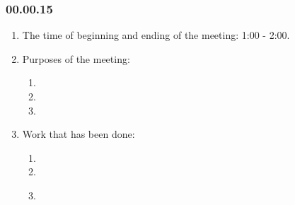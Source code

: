 \subsubsection{00.00.15}
\begin{enumerate}
	
	\item The time of beginning and ending of the meeting: 1:00 - 2:00.
	
	\item Purposes of the meeting: 
	\begin{enumerate}
		
		\item 
		
		\item 
		
        \item 
		
	\end{enumerate}

	\item Work that has been done:
	\begin{enumerate}
		
		\item 
		
		\item 
		
        \item 
		
        \begin{figure}[H]
	  	  \begin{minipage}[h]{0.2\linewidth}
	  	    \center  
	  	  \end{minipage}
	  	  \begin{minipage}[h]{0.6\linewidth}
	  		\caption{}
	  	  \end{minipage}
	   \end{figure}


\end{enumerate}
\end{enumerate}
